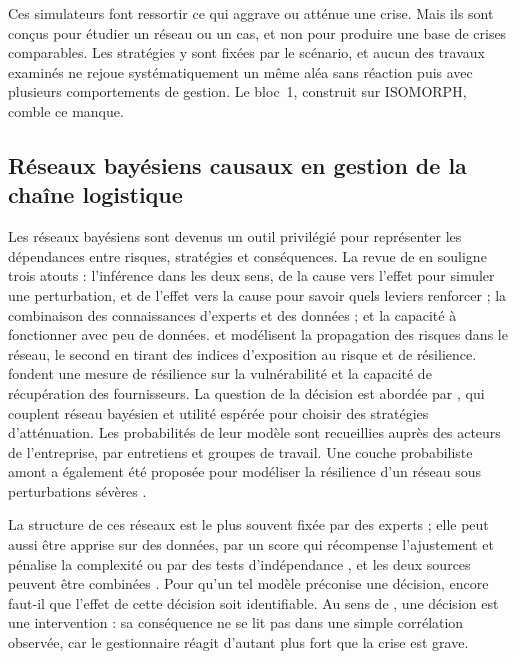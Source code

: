 Ces simulateurs font ressortir ce qui aggrave ou atténue une crise. Mais ils sont conçus pour étudier un réseau ou un cas, et non pour produire une base de crises comparables. Les stratégies y sont fixées par le scénario, et aucun des travaux examinés ne rejoue systématiquement un même aléa sans réaction puis avec plusieurs comportements de gestion. Le bloc~1, construit sur ISOMORPH, comble ce manque.

\subsection{Réseaux bayésiens causaux en gestion de la chaîne logistique}
\label{sec:ea-rb}

Les réseaux bayésiens sont devenus un outil privilégié pour représenter les dépendances entre risques, stratégies et conséquences. La revue de \citet{hosseiniivanov2020} en souligne trois atouts : l'inférence dans les deux sens, de la cause vers l'effet pour simuler une perturbation, et de l'effet vers la cause pour savoir quels leviers renforcer ; la combinaison des connaissances d'experts et des données ; et la capacité à fonctionner avec peu de données. \citet{garvey2015} et \citet{ojha2018} modélisent la propagation des risques dans le réseau, le second en tirant des indices d'exposition au risque et de résilience. \citet{hosseiniivanov2022aor} fondent une mesure de résilience sur la vulnérabilité et la capacité de récupération des fournisseurs. La question de la décision est abordée par \citet{qazi2018}, qui couplent réseau bayésien et utilité espérée pour choisir des stratégies d'atténuation. Les probabilités de leur modèle sont recueillies auprès des acteurs de l'entreprise, par entretiens et groupes de travail. Une couche probabiliste amont a également été proposée pour modéliser la résilience d'un réseau sous perturbations sévères \citep{rahiel2026codit}.

La structure de ces réseaux est le plus souvent fixée par des experts ; elle peut aussi être apprise sur des données, par un score qui récompense l'ajustement et pénalise la complexité ou par des tests d'indépendance \citep{koller2009, hosseiniivanov2020}, et les deux sources peuvent être combinées \citep{heckerman1995}. Pour qu'un tel modèle préconise une décision, encore faut-il que l'effet de cette décision soit identifiable. Au sens de \citet{pearl2009}, une décision est une intervention : sa conséquence ne se lit pas dans une simple corrélation observée, car le gestionnaire réagit d'autant plus fort que la crise est grave.

